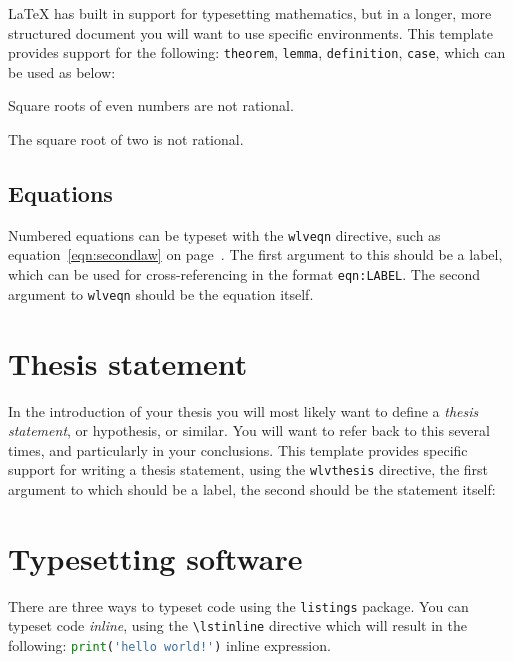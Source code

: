 \LaTeX{} has built in support for typesetting mathematics, but in a
longer, more structured document you will want to use specific
environments. This template provides support for the following:
\verb!theorem!, \verb!lemma!, \verb!definition!, \verb!case!, which
can be used as below:

\begin{theorem}
\label{thm:evens}
Square roots of even numbers are not rational.
\end{theorem}

\begin{lemma}
\label{thm:two}
The square root of two is not rational.
\end{lemma}

\subsection{Equations}

Numbered equations can be typeset with the \verb!wlveqn! directive,
such as equation~\ref{eqn:secondlaw} on 
page~\pageref{eqn:secondlaw}. The first argument to this should be a label,
which can be used for cross-referencing in the format
\verb!eqn:LABEL!. The second argument to \verb!wlveqn! should be the
equation itself.



\section{Thesis statement}


In the introduction of your thesis you will most likely want to define
a \emph{thesis statement}, or hypothesis, or similar. You will want to
refer back to this several times, and particularly in your
conclusions. This template provides specific support for writing a
thesis statement, using the \verb!wlvthesis! directive, the first
argument to which should be a label, the second should be the
statement itself:



\section{Typesetting software}

There are three ways to typeset code using the \verb!listings!
  package. You can typeset code \emph{inline}, using the
  \verb!\lstinline! directive which will result in the following:
  \lstinline[language=Python]$print('hello world!')$ inline
  expression.

